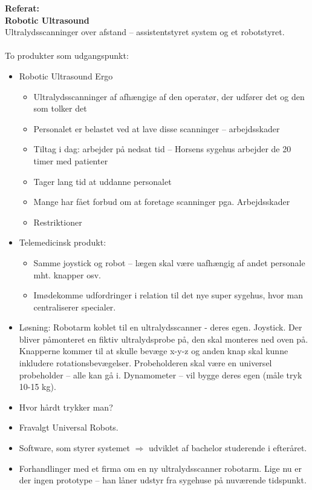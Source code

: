 \textbf{Referat:}\\
\textbf{Robotic Ultrasound}\\
Ultralydsscanninger over afstand – assistentstyret system og et robotstyret. \\\\
To produkter som udgangspunkt:
\begin{itemize}
\item Robotic Ultrasound Ergo
	\begin{itemize}
	\item Ultralydsscanninger af afhængige af den operatør, der udfører det og den som tolker det
	\item Personalet er belastet ved at lave disse scanninger – arbejdsskader
	\item Tiltag i dag: arbejder på nedsat tid – Horsens sygehus arbejder de 20 timer med patienter
	\item Tager lang tid at uddanne personalet
	\item Mange har fået forbud om at foretage scanninger pga. Arbejdsskader
	\item Restriktioner
	\end{itemize}
\item Telemedicinsk produkt: 
	\begin{itemize}
	\item Samme joystick og robot – lægen skal være uafhængig af andet personale mht. knapper osv. 
	\item Imødekomme udfordringer i relation til det nye super sygehus, hvor man centraliserer specialer. 
	\end{itemize}
\end{itemize}
\begin{itemize}
\item Løsning: Robotarm koblet til en ultralydsscanner - deres egen. Joystick. Der bliver påmonteret en fiktiv ultralydsprobe på, den skal monteres ned oven på. Knapperne kommer til at skulle bevæge x-y-z og anden knap skal kunne inkludere rotationsbevægelser. Probeholderen skal være en universel probeholder – alle kan gå i. Dynamometer – vil bygge deres egen (måle tryk 10-15 kg). 
\item Hvor hårdt trykker man? 
\item Fravalgt Universal Robots.
\item Software, som styrer systemet $\Rightarrow$ udviklet af bachelor studerende i efteråret. 
\item Forhandlinger med et firma om en ny ultralydsscanner robotarm. Lige nu er der ingen prototype – han låner udstyr fra sygehuse på nuværende tidspunkt.
\end{itemize}
